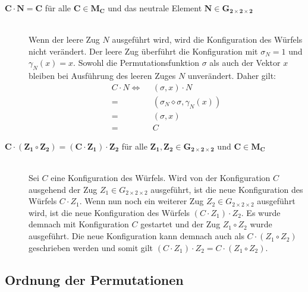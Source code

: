 \documentclass[12pt,a4paper, usenames, dvipsnames]{article}
\theoremstyle{mystyle}
\theoremstyle{definition}
\newcommand{\Gtwo}{\ensuremath{G_{2\times 2\times 2}}}
\begin{document}
\begin{description}
\item [$\boldsymbol{C \cdot N = C}$ für alle $\boldsymbol{C \in M_C}$ und das neutrale Element $\boldsymbol{N \in \Gtwo}$] 
\ \\
Wenn der leere Zug $N$ ausgeführt wird, wird die Konfiguration des Würfels nicht verändert. Der leere Zug überführt die Konfiguration mit $\sigma_N=1$ und $\gamma_N(x)=x$. Sowohl die Permutationsfunktion $\sigma$ als auch der Vektor $x$ bleiben bei Ausführung des leeren Zuges $N$ unverändert. Daher gilt:
\begin{align*}
 C \cdot N 
\Leftrightarrow \ \ & (\sigma, x) \cdot  N \\
= \ \ & (\sigma_N \diamond \sigma, \gamma_N(x)) \\
= \ \ & (\sigma, x) \\
= \ \ & C
\end{align*}

\item [$\boldsymbol{C \cdot (Z_1 \circ Z_2) = (C \cdot Z_1) \cdot Z_2}$ für alle $\boldsymbol{Z_1, Z_2 \in \Gtwo}$ und $\boldsymbol{C \in M_C}$]
\ \\
Sei $C$ eine Konfiguration des Würfels. Wird von der Konfiguration $C$ ausgehend der Zug $Z_1 \in \Gtwo$ ausgeführt, ist die neue Konfiguration des Würfels $C \cdot Z_1$. Wenn nun noch ein weiterer Zug $Z_2 \in \Gtwo$ ausgeführt wird, ist die neue Konfiguration des Würfels $(C \cdot Z_1) \cdot Z_2$. 
Es wurde demnach mit Konfiguration $C$ gestartet und der Zug $Z_1 \circ Z_2$ wurde ausgeführt. Die neue Konfiguration kann demnach auch als $C \cdot (Z_1 \circ Z_2)$ geschrieben werden und somit gilt $(C \cdot Z_1) \cdot Z_2 = C \cdot (Z_1 \circ Z_2)$. 
\end{description}

%
%
%
%
%
%
%
%
%
%
%
%

\subsection{Ordnung der Permutationen}
 \label{Abschnitt_OrdnungPermutationen}
\end{document}
